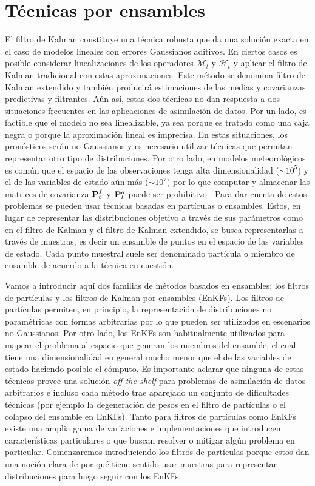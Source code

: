 \section{Técnicas por ensambles}
El filtro de Kalman constituye una técnica robusta que da una solución exacta en el caso de modelos lineales con errores Gaussianos aditivos. En ciertos casos es posible considerar linealizaciones de los operadores $\mathcal{M}_t$ y $\mathcal{H}_t$ y aplicar el filtro de Kalman tradicional con estas aproximaciones. Este método se denomina filtro de Kalman extendido y también producirá estimaciones de las medias y covarianzas predictivas y filtrantes. Aún así, estas dos técnicas no dan respuesta a dos situaciones frecuentes en las aplicaciones de asimilación de datos. Por un lado, es factible que el modelo no sea linealizable, ya sea porque es tratado como una caja negra o porque la aproximación lineal es imprecisa. En estas situaciones, los pronósticos serán no Gaussianos y es necesario utilizar técnicas que permitan representar otro tipo de distribuciones. Por otro lado, en modelos meteorológicos es común que el espacio de las observaciones tenga alta dimensionalidad ($\sim 10^5$) y el de las variables de estado aún más ($\sim 10^7$) por lo que computar y almacenar las matrices de covarianza $\mathbf{P}_t^f$ y $\mathbf{P}_t^a$ puede ser prohibitivo \citep{Katzfuss2016}. Para dar cuenta de estos problemas se pueden usar técnicas basadas en partículas o ensambles. Estos, en lugar de representar las distribuciones objetivo a través de sus parámetros como en el filtro de Kalman y el filtro de Kalman extendido, se busca representarlas a través de muestras, es decir un ensamble de puntos en el espacio de las variables de estado. Cada punto muestral suele ser denominado partícula o miembro de ensamble de acuerdo a la técnica en cuestión.

Vamos a introducir aquí dos familias de métodos basados en ensambles: los filtros de partículas y los filtros de Kalman por ensambles (EnKFs). Los filtros de partículas permiten, en principio, la representación de distribuciones no paramétricas con formas arbitrarias por lo que pueden ser utilizados en escenarios no Gaussianos. Por otro lado, los EnKFs son habitualmente utilizados para mapear el problema al espacio que generan los miembros del ensamble, el cual tiene una dimensionalidad en general mucho menor que el de las variables de estado haciendo posible el cómputo. Es importante aclarar que ninguna de estas técnicas provee una solución \textit{off-the-shelf} para problemas de asimilación de datos arbitrarios e incluso cada método trae aparejado un conjunto de dificultades técnicas (por ejemplo la degeneración de pesos en el filtro de partículas o el colapso del ensamble en EnKFs). Tanto para filtros de partículas como EnKFs existe una amplia gama de variaciones e implementaciones que introducen características particulares o que buscan resolver o mitigar algún problema en particular. Comenzaremos introduciendo los filtros de partículas porque estos dan una noción clara de por qué tiene sentido usar muestras para representar distribuciones para luego seguir con los EnKFs.


